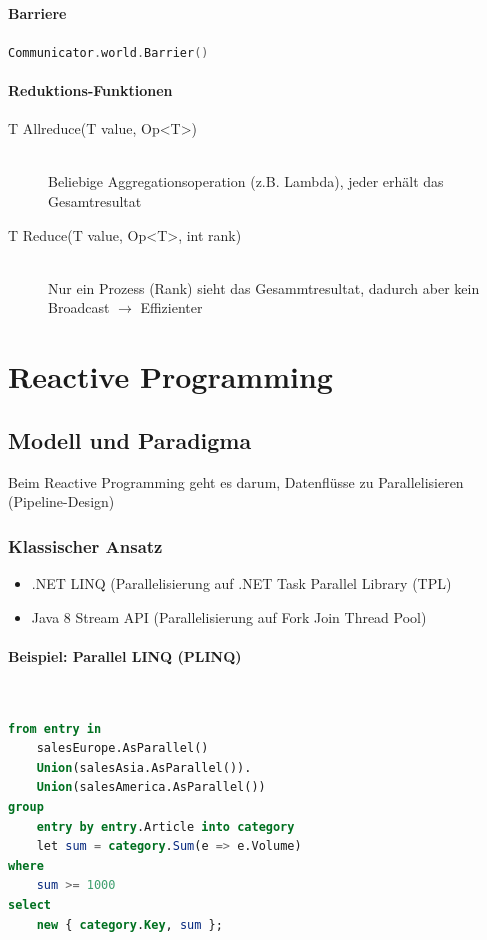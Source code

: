 \paragraph{Barriere} \lstinline[language=C]|Communicator.world.Barrier()|


\paragraph{Reduktions-Funktionen}

\begin{description}
	\item[T Allreduce(T value, Op<T>)] \hfill \\
		Beliebige Aggregationsoperation (z.B. Lambda), jeder erhält das Gesamtresultat
	\item[T Reduce(T value, Op<T>, int rank)] \hfill \\
		Nur ein Prozess (Rank) sieht das Gesammtresultat, dadurch aber kein Broadcast $\rightarrow$ Effizienter
\end{description}


\section{Reactive Programming}

\subsection{Modell und Paradigma}

Beim Reactive Programming geht es darum, Datenflüsse zu Parallelisieren (Pipeline-Design)

\subsubsection{Klassischer Ansatz}

\begin{itemize}
	\item .NET LINQ (Parallelisierung auf .NET Task Parallel Library (TPL)
	\item Java 8 Stream API (Parallelisierung auf Fork Join Thread Pool)
\end{itemize}

\paragraph{Beispiel: Parallel LINQ (PLINQ)} \hfill \\
\begin{lstlisting}[language=SQL]
from entry in
	salesEurope.AsParallel()
	Union(salesAsia.AsParallel()).
	Union(salesAmerica.AsParallel())
group
	entry by entry.Article into category
	let sum = category.Sum(e => e.Volume)
where
	sum >= 1000
select
	new { category.Key, sum };
\end{lstlisting}


